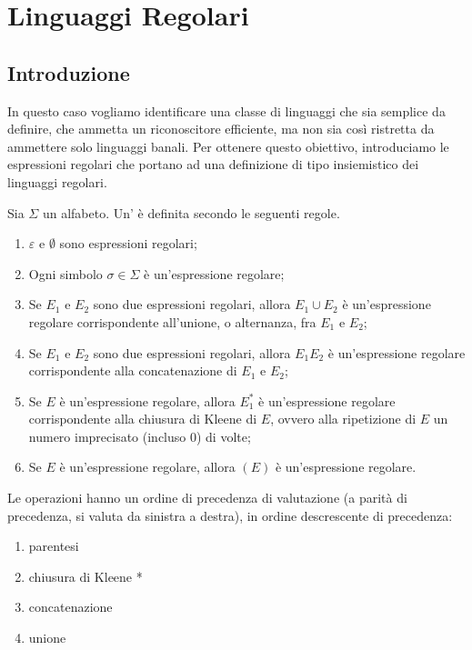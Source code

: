 \setchapterpreamble[u]{\margintoc}
\chapter{Linguaggi Regolari}\label{cha:Linguaggi-regolari}




\section{Introduzione}\label{sec:regolari-introduzione}

In questo caso vogliamo identificare una classe di linguaggi che sia semplice da definire, che ammetta un riconoscitore
efficiente, ma non sia così ristretta da ammettere solo linguaggi banali.
Per ottenere questo obiettivo, introduciamo le espressioni regolari che portano ad una definizione di tipo
insiemistico dei linguaggi regolari.

\begin{definition}\label{def:regex}
Sia $\Sigma$ un alfabeto. Un' è definita secondo le seguenti regole.
\begin{enumerate}
\item $\varepsilon$ e $\emptyset$ sono espressioni regolari;
\item Ogni simbolo $\sigma\in\Sigma$ è un'espressione regolare;
\item Se $E_1$ e $E_2$ sono due espressioni regolari, allora $E_1 \cup E_2$ è un'espressione regolare corrispondente
	  all'unione, o alternanza, fra $E_1$ e $E_2$;
\item Se $E_1$ e $E_2$ sono due espressioni regolari, allora $E_1 E_2$ è un'espressione regolare corrispondente
	  alla concatenazione di $E_1$ e $E_2$;
\item Se $E$ è un'espressione regolare, allora $E_1^{*}$ è un'espressione regolare corrispondente
	  alla chiusura di Kleene di $E$, ovvero alla ripetizione di $E$ un numero imprecisato (incluso $0$) di volte;
\item Se $E$ è un'espressione regolare, allora $(E)$ è un'espressione regolare.
\end{enumerate}
\end{definition}

Le operazioni hanno un ordine di precedenza di valutazione (a parità di precedenza, si valuta da sinistra a destra), in
ordine descrescente di precedenza:
\begin{enumerate}
	\item parentesi
	\item chiusura di Kleene *
	\item concatenazione
	\item unione
\end{enumerate}


